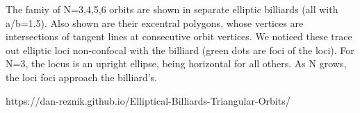 The famiy of N=3,4,5,6 orbits are shown in separate elliptic billiards (all with a/b=1.5). Also shown are their excentral polygons, whose vertices are intersections of tangent lines at consecutive orbit vertices. We noticed these trace out elliptic loci non-confocal with the billiard (green dots are foci of the loci). For N=3, the locus is an upright ellipse, being horizontal for all others. As N grows, the loci foci approach the billiard's.

https://dan-reznik.github.io/Elliptical-Billiards-Triangular-Orbits/